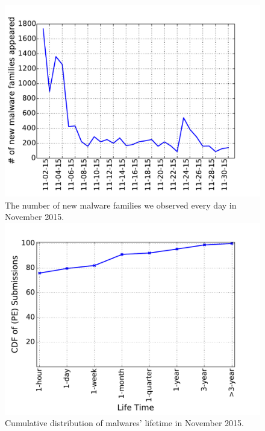 \begin{figure}[!htb]
  \includegraphics[width=\linewidth]{figure/new_family}
{
The number of new malware families we observed every day in November 2015.
}
\endminipage\hfill
{}
  \includegraphics[width=\linewidth]{figure/lifetime}
{
Cumulative distribution of malwares' lifetime in November 2015.
}
\endminipage\hfill
{}%

\end{figure}
